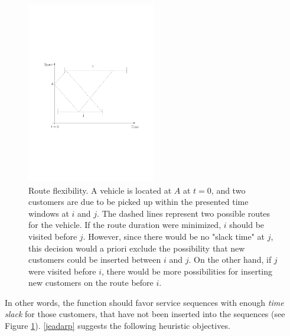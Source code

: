\documentclass[dissertation,draft*]{aaltoseries}
\begin{document}
\begin{figure}[ht]
\begin{center}
\includegraphics[width=0.5\textwidth]{flexibility03.pdf}
\caption{Route flexibility. A vehicle is located at $A$ at $t = 0$,
and two customers are due to be picked up within the presented time windows at $i$ and $j$.
The dashed lines represent two possible routes for the vehicle.
If the route duration were minimized, $i$ should be visited before $j$. However, since
there would be no "slack time" at $j$, this decision would a priori 
exclude the possibility that new customers could be inserted between $i$ and $j$. 
On the other hand, if $j$ were visited before $i$, there would be
more possibilities for inserting new customers on the route before $i$. }
\label{flexibility01}
\end{center}
\end{figure}


In other words, the function should favor service sequences with enough 
\emph{time slack} for those customers, that have not been inserted into the sequences (see Figure \ref{flexibility01}).
\ref{jeadarp} suggests the following heuristic objectives.

% 
\end{document}
